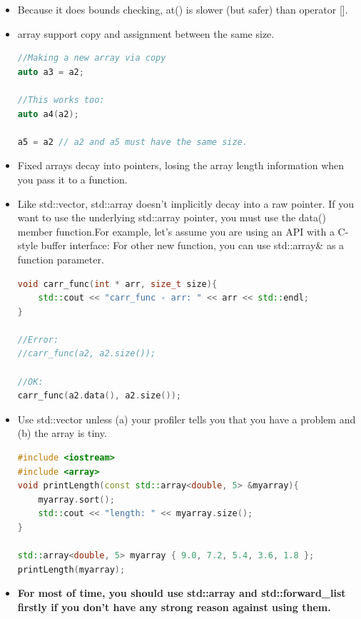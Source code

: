 \documentclass[a4paper,11pt,twoside]{book}
\begin{document}
\begin{itemize}
\item Because it does bounds checking, at() is slower (but safer) than operator [].

\item array support copy and assignment between the same size.
\begin{lstlisting}[frame=single, language=c++]
//Making a new array via copy
auto a3 = a2;

//This works too:
auto a4(a2);

a5 = a2 // a2 and a5 must have the same size.
\end{lstlisting}


\item Fixed arrays decay into pointers, losing the array length information when you pass it to a function.

\item Like std::vector, std::array doesn't implicitly decay into a raw pointer. If you want to use the underlying std::array pointer, you must use the data() member function.For example, let's assume you are using an API with a C-style buffer interface: For other new function, you can use std::array\& as a function parameter. 

\begin{lstlisting}[frame=single, language=c++]
void carr_func(int * arr, size_t size){
    std::cout << "carr_func - arr: " << arr << std::endl;
}

//Error:
//carr_func(a2, a2.size());

//OK:
carr_func(a2.data(), a2.size());
\end{lstlisting}

\item Use std::vector unless (a) your profiler tells you that you have a problem and (b) the array is tiny.
\begin{lstlisting}[frame=single, language=c++]
#include <iostream>
#include <array>
void printLength(const std::array<double, 5> &myarray){
    myarray.sort();
    std::cout << "length: " << myarray.size();
}

std::array<double, 5> myarray { 9.0, 7.2, 5.4, 3.6, 1.8 };
printLength(myarray);
\end{lstlisting}


\item \textbf{For most of time, you should use std::array and std::forward\_list firstly if you don't have any strong reason against using them.} 
\end{itemize}
\end{document}
